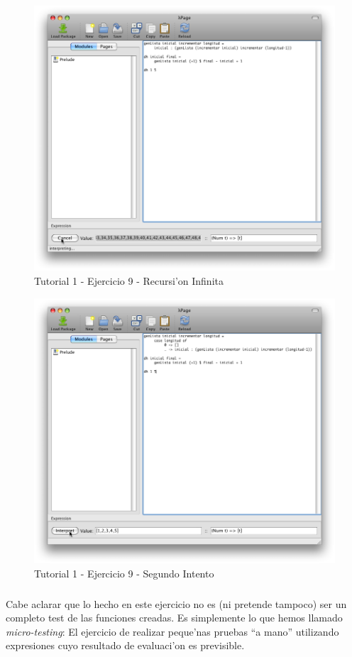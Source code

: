 \documentclass[a4paper]{article}
\begin{document}
\begin{figure}[hp]
	\begin{center}
        	\includegraphics[width=.75\textwidth]{pictures/tut1/07}
		\caption{Tutorial 1 - Ejercicio 9 - Recursi'on Infinita}
		\label{tut107}
	\end{center}
\end{figure}
\begin{figure}[hp]
	\begin{center}
        	\includegraphics[width=.75\textwidth]{pictures/tut1/08}
		\caption{Tutorial 1 - Ejercicio 9 - Segundo Intento}
		\label{tut108}
	\end{center}
\end{figure}
\subparagraph{}Cabe aclarar que lo hecho en este ejercicio no es (ni pretende tampoco) ser un completo test de las funciones creadas.  Es simplemente lo que hemos llamado \textsl{micro-testing}: El ejercicio de realizar peque'nas pruebas ``a mano'' utilizando expresiones cuyo resultado de evaluaci'on es previsible.
\end{document}
